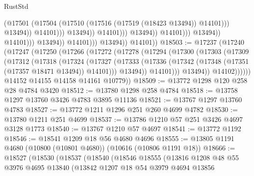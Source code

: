 \begin{lexlean}{RustStd}
\begin{coremodule}
                                                            (@17501
                                                              (@17504
                                                                (@17510
                                                                  (@17516
                                                                    (@17519 (@18423 @13494))
                                                                    @14101)))
                                                              @13494))
                                                          @14101)))
                                                    @13494))
                                                @14101)))
                                          @13494))
                                      @14101)))
                                @13494))
                            @14101)))
                      @13494))
                  @14101)))
            @13494))
        @14101))
@18503 := @17237
    (@17240
      (@17247
        (@17250
          (@17266
            (@17272
              (@17278
                (@17294
                  (@17300
                    (@17303
                      (@17309
                        (@17312
                          (@17318
                            (@17324
                              (@17327
                                (@17333
                                  (@17336 (@17342 (@17348 (@17351 (@17357 @18471 @13494)) @14101)))
                                  @13494))
                              @14101)))
                        @13494))
                    @14102))))))
        @14152
        @14155
        @14158
        @14161
        @10779))
@18509 := @13772 @1298 @120 @258 @28 @4784 @3420
@18512 := @13780 @1298 @258 @4784
@18518 := @13758 @1297 @13760 @3426 @4783 @3895 @11136
@18521 := @13767 @1297 @13760 @4783
@18527 := @13772 @1211 @1296 @251 @260 @4699 @4782
@18530 := @13780 @1211 @251 @4699
@18537 := @13786 @1210 @57 @251 @3426 @4697 @3128 @1773
@18540 := @13767 @1210 @57 @4697
@18541 := @13772 @1192
@18546 := @18541 @1209 @18 @56 @4680 @4696
@18555 := @13805 @1191 @4680 (@10800 (@10801 @4680)) (@10616 (@10806 @1191 @18))
@18666 := @18527
    (@18530
      (@18537
        (@18540
          (@18546
            @18555
            (@13816
              @1208
              @48
              @55
              @3976
              @4695
              @13840
              (@13842
                @1207
                @18
                @54
                @3979
                @4694
                @13856

\end{coremodule}
\end{lexlean}
